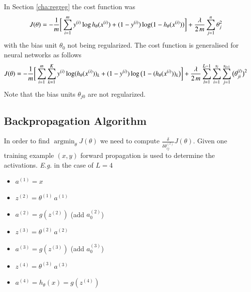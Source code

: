 \documentclass[a4paper,twoside,10pt]{article}
\begin{document}
In Section \ref{cha:regreg} the cost function was
\begin{equation*}
  J(\theta)=-\frac{1}{m}\bigg[\displaystyle\sum_{i=1}^my^{(i)}\operatorname{log}h_\theta(x^{(i)})+(1-y^{(i)})\operatorname{log}(1-h_\theta(x^{(i)}))\bigg]+
  \frac{\lambda}{2\,m}\sum_{j=1}^n\theta_j^2
\end{equation*}
with the bias unit $\theta_0$ not being regularized. The cost function is generalised for neural networks as follows
\newcommand{\sumk}{\ensuremath{\displaystyle\sum_{k=1}^K}}
\newcommand{\suml}{\ensuremath{\displaystyle\sum_{l=1}^{L-1}}}
\begin{equation*}
  J(\theta)=-\frac{1}{m}\bigg[\sumi\sumk\syi\operatorname{log}(h_\theta(\sxi))_k+(1-\syi)\operatorname{log}\big(1-(h_\theta(\sxi))_k\big)\bigg]+
  \frac{\lambda}{2\,m}\suml\sum_{i=1}^{s_l}\sum_{j=1}^{s_{l+1}}\big(\theta^{(l)}_{ji}\big)^2
\end{equation*}
Note that the bias units $\theta_{j0}$ are not regularized.

\subsection{Backpropagation Algorithm}\label{cha:backprop}
In order to find $\mathop{\operatorname{argmin}}_\theta J(\theta)$ we need to compute $\frac{\delta}{\delta\theta^{(l)}_{ij}}J(\theta)$.
Given one training example $(x,y)$ forward propagation is used to determine the activations.
\emph{E.g.} in the case of $L=4$
\begin{itemize}
  \item $a^{(1)}=x$
  \item $z^{(2)}=\theta^{(1)}\,a^{(1)}$
  \item $a^{(2)}=g(z^{(2)})$ (add $a^{(2)}_0$)
  \item $z^{(3)}=\theta^{(2)}\,a^{(2)}$
  \item $a^{(3)}=g(z^{(3)})$ (add $a^{(3)}_0$)
  \item $z^{(4)}=\theta^{(3)}\,a^{(3)}$
  \item $a^{(4)}=h_\theta(x)=g(z^{(4)})$
\end{itemize}
\end{document}
